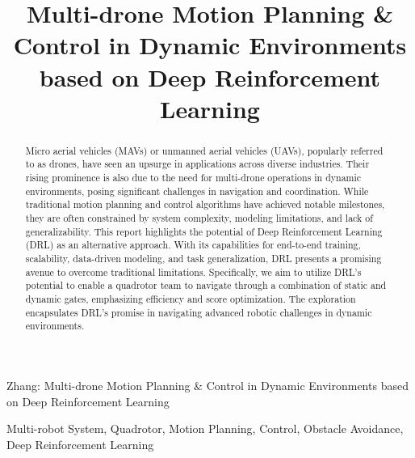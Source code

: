 \documentclass[letterpaper,journal,twoside]{IEEEtran}
\begin{document}
\title{Multi-drone Motion Planning \& Control in Dynamic Environments based on Deep Reinforcement Learning}

\author{
}

\maketitle

\begingroup
\renewcommand\thefootnote{}
\endgroup

%
{Zhang: Multi-drone Motion Planning \& Control in Dynamic Environments based on Deep Reinforcement Learning}



\begin{abstract}
  Micro aerial vehicles (MAVs) or unmanned aerial vehicles (UAVs), popularly referred to as drones, have seen an upsurge in applications across diverse industries. Their rising prominence is also due to the need for multi-drone operations in dynamic environments, posing significant challenges in navigation and coordination. While traditional motion planning and control algorithms have achieved notable milestones, they are often constrained by system complexity, modeling limitations, and lack of generalizability. This report highlights the potential of Deep Reinforcement Learning (DRL) as an alternative approach. With its capabilities for end-to-end training, scalability, data-driven modeling, and task generalization, DRL presents a promising avenue to overcome traditional limitations. Specifically, we aim to utilize DRL's potential to enable a quadrotor team to navigate through a combination of static and dynamic gates, emphasizing efficiency and score optimization. The exploration encapsulates DRL's promise in navigating advanced robotic challenges in dynamic environments.
\end{abstract}

\begin{IEEEkeywords}
  Multi-robot System, Quadrotor, Motion Planning, Control, 
  Obstacle Avoidance, Deep Reinforcement Learning
\end{IEEEkeywords}
\end{document}
